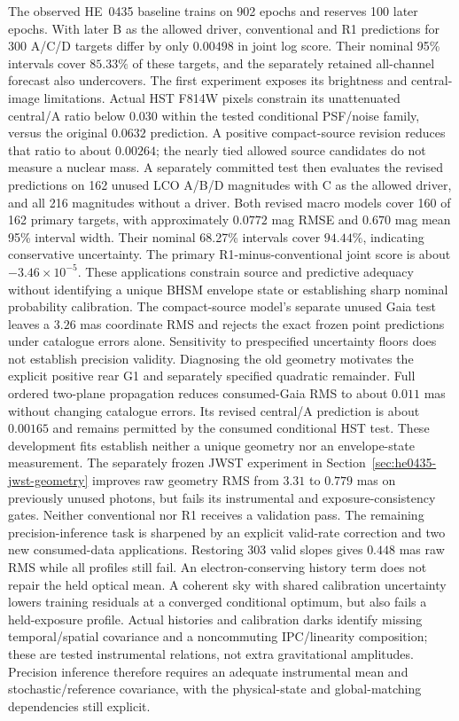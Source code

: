 The observed HE~0435 baseline trains on 902 epochs and reserves 100
later epochs. With later B as the allowed driver, conventional and R1
predictions for 300 A/C/D targets differ by only $0.00498$ in joint log
score. Their nominal 95\% intervals cover $85.33\%$ of these targets,
and the separately retained all-channel forecast also undercovers.
The first experiment exposes its brightness and central-image limitations.
Actual HST F814W pixels constrain its unattenuated central/A ratio below
$0.030$ within the tested conditional PSF/noise family, versus the original
$0.0632$ prediction. A positive compact-source revision reduces that ratio
to about $0.00264$; the nearly tied allowed source candidates do not measure
a nuclear mass. A separately committed test then evaluates the revised
predictions on 162 unused LCO A/B/D magnitudes with C as the allowed driver,
and all 216 magnitudes without a driver. Both revised macro models cover
160 of 162 primary targets, with approximately $0.0772$ mag RMSE and
$0.670$ mag mean 95\% interval width. Their nominal 68.27\% intervals
cover $94.44\%$, indicating conservative uncertainty. The primary
R1-minus-conventional joint score is about $-3.46\times10^{-5}$.
These applications constrain source and predictive adequacy without
identifying a unique BHSM envelope state or establishing sharp nominal
probability calibration.
The compact-source model's separate unused Gaia test leaves a $3.26$ mas coordinate RMS and
rejects the exact frozen point predictions under catalogue errors alone.
Sensitivity to prespecified uncertainty floors does not establish precision
validity. Diagnosing the old geometry motivates the explicit positive
rear G1 and separately specified quadratic remainder. Full ordered
two-plane propagation reduces consumed-Gaia RMS to about $0.011$ mas
without changing catalogue errors. Its revised central/A prediction is
about $0.00165$ and remains permitted by the consumed conditional HST
test. These development fits establish neither a unique geometry nor
an envelope-state measurement. The separately frozen JWST experiment
in Section~\ref{sec:he0435-jwst-geometry} improves raw geometry RMS from
$3.31$ to $0.779$ mas on previously unused photons, but fails its
instrumental and exposure-consistency gates. Neither conventional nor
R1 receives a validation pass. The remaining precision-inference task
is sharpened by an explicit valid-rate correction and two new consumed-data
applications. Restoring 303 valid slopes gives $0.448$ mas raw RMS while
all profiles still fail. An electron-conserving history term does not
repair the held optical mean. A coherent sky with shared calibration
uncertainty lowers training residuals at a converged conditional optimum,
but also fails a held-exposure profile. Actual histories and calibration
darks identify missing temporal/spatial covariance and a noncommuting
IPC/linearity composition; these are tested instrumental relations,
not extra gravitational amplitudes. Precision inference therefore
requires an adequate instrumental mean and stochastic/reference covariance,
with the physical-state and global-matching dependencies still explicit.

